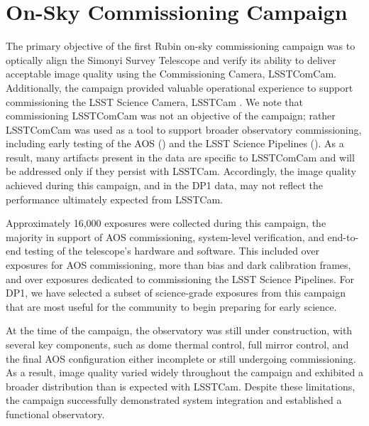 \section{On-Sky Commissioning Campaign}
\label{sec:on_sky_campaign}
%
The primary objective of the first Rubin on-sky commissioning campaign was to optically align the Simonyi Survey Telescope and verify its ability to deliver acceptable image quality using the Commissioning Camera, \gls{LSSTComCam}.
Additionally, the campaign provided valuable operational experience to support commissioning the LSST Science Camera, \gls{LSSTCam} \citep{2024SPIE13096E..1OL,2024SPIE13096E..1SR}.
We note that commissioning \gls{LSSTComCam} was not an objective of the campaign; rather \gls{LSSTComCam} was used as a tool to support broader observatory commissioning, including early testing of the \gls{AOS} () and the LSST Science Pipelines ().
As a result, many artifacts present in the data are specific to \gls{LSSTComCam} and will be addressed only if they persist with \gls{LSSTCam}.
Accordingly, the image quality achieved during this campaign, and in the \gls{DP1} data, may not reflect the performance ultimately expected from \gls{LSSTCam}.

Approximately 16,000 exposures were collected during this campaign, the majority in support of \gls{AOS} commissioning, system-level verification, and end-to-end testing of the telescope’s hardware and software.
This included over \nexposuresaoscommissioning exposures for \gls{AOS} commissioning, more than \nexposurescalibcommissioning bias and dark calibration frames, and over \nexposuresspcommissioning exposures dedicated to commissioning the LSST Science Pipelines.
For \gls{DP1}, we have selected a subset of \nexposures science-grade exposures from this campaign that are most useful for the community to begin preparing for early science.

At the time of the campaign, the observatory was still under construction, with several key components, such as dome thermal control, full mirror control, and the final \gls{AOS} configuration either incomplete or still undergoing commissioning.
As a result, image quality varied widely throughout the campaign and exhibited a broader distribution than is expected with \gls{LSSTCam}.
Despite these limitations, the campaign successfully demonstrated system integration and established a functional observatory.

